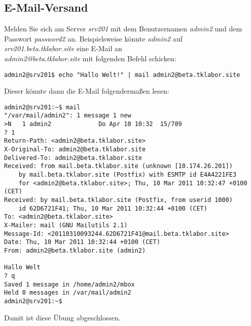 \subsection{E-Mail-Versand}
Melden Sie sich am Server \textit{srv201} mit dem Benutzernamen \textit{admin2}
und dem Passwort \textit{password2} an. Beispielsweise könnte \textit{admin2}
auf
\\
\textit{srv201.beta.tklabor.site} eine E-Mail an \\
\textit{admin2@beta.tklabor.site} mit folgenden Befehl schicken:

\begin{lstlisting}
admin2@srv201$ echo "Hallo Welt!" | mail admin2@beta.tklabor.site
\end{lstlisting}

Dieser könnte dann die E-Mail folgendermaßen lesen:
\begin{scriptsize}
\begin{lstlisting}
admin2@srv201:~$ mail
"/var/mail/admin2": 1 message 1 new
>N   1 admin2             Do Apr 10 10:32  15/789   
? 1
Return-Path: <admin2@beta.tklabor.site>
X-Original-To: admin2@beta.tklabor.site
Delivered-To: admin2@beta.tklabor.site
Received: from mail.beta.tklabor.site (unknown [10.174.26.201])
	by mail.beta.tklabor.site (Postfix) with ESMTP id E4A4221FE3
	for <admin2@beta.tklabor.site>; Thu, 10 Mar 2011 10:32:47 +0100 (CET)
Received: by mail.beta.tklabor.site (Postfix, from userid 1000)
	id 62D6721F41; Thu, 10 Mar 2011 10:32:44 +0100 (CET)
To: <admin2@beta.tklabor.site>
X-Mailer: mail (GNU Mailutils 2.1)
Message-Id: <20110310093244.62D6721F41@mail.beta.tklabor.site>
Date: Thu, 10 Mar 2011 10:32:44 +0100 (CET)
From: admin2@beta.tklabor.site (admin2)

Hallo Welt
? q
Saved 1 message in /home/admin2/mbox
Held 0 messages in /var/mail/admin2
admin2@srv201:~$ 
\end{lstlisting}
\end{scriptsize}

Damit ist diese Übung abgeschlossen.
